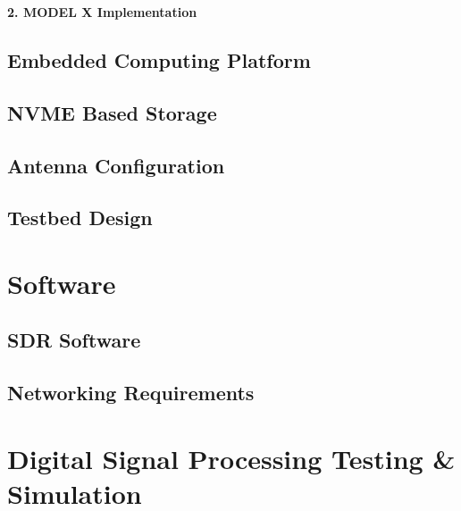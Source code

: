 \vspace{0.5cm} \noindent 
\textbf{2. MODEL X Implementation}



\subsection{Embedded Computing Platform \label{sec:embedded computing}}
\subsection{NVME Based Storage \label{sec:storage}}
\subsection{Antenna Configuration \label{sec:antenna}}
\subsection{Testbed Design \label{sec:testbed}}


\section{Software}
\subsection{SDR Software \label{sec:SDRsoftware}}
\subsection{Networking Requirements \label{sec:networking}}


\section{Digital Signal Processing Testing \& Simulation}



